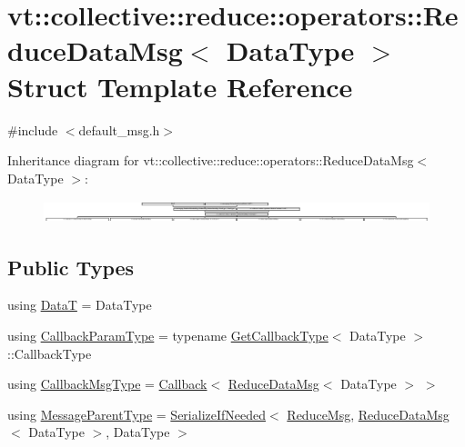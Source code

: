 \hypertarget{structvt_1_1collective_1_1reduce_1_1operators_1_1_reduce_data_msg}{}\section{vt\+:\+:collective\+:\+:reduce\+:\+:operators\+:\+:Reduce\+Data\+Msg$<$ Data\+Type $>$ Struct Template Reference}
\label{structvt_1_1collective_1_1reduce_1_1operators_1_1_reduce_data_msg}


{\ttfamily \#include $<$default\+\_\+msg.\+h$>$}

Inheritance diagram for vt\+:\+:collective\+:\+:reduce\+:\+:operators\+:\+:Reduce\+Data\+Msg$<$ Data\+Type $>$\+:\begin{figure}[H]
\begin{center}
\leavevmode
\includegraphics[height=0.667859cm]{structvt_1_1collective_1_1reduce_1_1operators_1_1_reduce_data_msg}
\end{center}
\end{figure}
\subsection*{Public Types}
\begin{DoxyCompactItemize}
\item 
using \hyperlink{structvt_1_1collective_1_1reduce_1_1operators_1_1_reduce_data_msg_a33b96667b96604c31bf0986b52e0eee3}{DataT} = Data\+Type
\item 
using \hyperlink{structvt_1_1collective_1_1reduce_1_1operators_1_1_reduce_data_msg_a4a0c225ffa4221beb2bfba11ac33e5b6}{Callback\+Param\+Type} = typename \hyperlink{structvt_1_1collective_1_1reduce_1_1operators_1_1_get_callback_type}{Get\+Callback\+Type}$<$ Data\+Type $>$\+::Callback\+Type
\item 
using \hyperlink{structvt_1_1collective_1_1reduce_1_1operators_1_1_reduce_data_msg_aa65f18bb2f7493d54e4b776787b7405c}{Callback\+Msg\+Type} = \hyperlink{namespacevt_a57b238783d05de96bc2c4027f7073b7f}{Callback}$<$ \hyperlink{structvt_1_1collective_1_1reduce_1_1operators_1_1_reduce_data_msg}{Reduce\+Data\+Msg}$<$ Data\+Type $>$ $>$
\item 
using \hyperlink{structvt_1_1collective_1_1reduce_1_1operators_1_1_reduce_data_msg_a6b5182cf48445f9d03dc6e5905a4eba1}{Message\+Parent\+Type} = \hyperlink{namespacevt_a0a4ad8c256fcffa564e9fa7800e4b495}{Serialize\+If\+Needed}$<$ \hyperlink{structvt_1_1collective_1_1reduce_1_1_reduce_msg}{Reduce\+Msg}, \hyperlink{structvt_1_1collective_1_1reduce_1_1operators_1_1_reduce_data_msg}{Reduce\+Data\+Msg}$<$ Data\+Type $>$, Data\+Type $>$
\end{DoxyCompactItemize}
